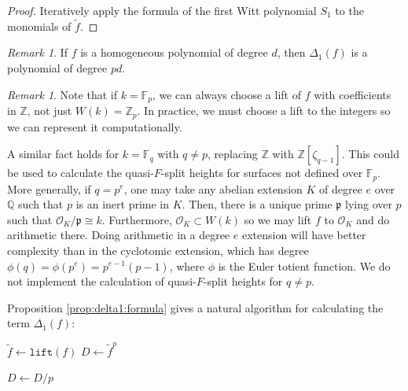 \documentclass[a4paper]{article}
\theoremstyle{definition}
\theoremstyle{remark}
\newtheorem{rmk}[thm]{Remark}
\newcommand{\isom}{\cong}
\newcommand{\ins}{\subset}
\begin{document}
\begin{proof}
	Iteratively apply the formula of the first
	Witt polynomial \(S_{1}\) 
	to the monomials of \(\tilde{f}\).
\end{proof}

\begin{rmk}
	If \(f\) is a homogeneous polynomial of degree \(d\), 
	then \(\Delta_{1}(f)\) is a polynomial of degree \(pd\).
\end{rmk}

\begin{rmk}
    \label{rmk:lift:roi}
    Note that if \(k = \mathbb{F}_{p}\), we can always choose a lift
    of \(f\) with coefficients in \(\mathbb{Z}\), 
    not just \(W(k) = \mathbb{Z}_{p}\).
    In practice, we must choose a lift to the integers
    so we can represent it computationally.

    A similar fact holds for \(k = \mathbb{F}_{q}\) with 
    \(q \neq p\), replacing \(\mathbb{Z}\) with
    \(\mathbb{Z}[\zeta_{q-1}]\).
    This could be used to calculate the quasi-\(F\)-split 
    heights for surfaces not defined over \(\mathbb{F}_{p}\).
    More generally, if \(q = p^{e}\), one may take
    any abelian extension \(K\) of degree \(e\) over \(\mathbb{Q}\) such that
    \(p\) is an inert prime in \(K\).
    Then, there is a unique prime \(\mathfrak{p}\) lying over \(p\) 
    such that \(\mathcal{O}_{K} / \mathfrak{p} \isom k\).
    Furthermore, \(\mathcal{O}_{K} \ins W(k)\)
    so we may lift \(f\) to \(\mathcal{O}_{K}\) 
    and do arithmetic there. 
    Doing arithmetic in a degree \(e\) extension will have
    better complexity than in the cyclotomic extension, which
    has degree \(\phi(q) = \phi(p^{e}) = p^{e-1}(p-1)\), where
    \(\phi\) is the Euler totient function.
    We do not implement the calculation of quasi-\(F\)-split
    heights for \(q \neq p\).
\end{rmk}



Proposition \ref{prop:delta1:formula} gives a natural algorithm
for calculating the term \(\Delta_{1}(f)\): 


\begin{algorithm}[H]
\label{alg:calc:delta1}
\caption{Calculation of \(\Delta_{1}(f)\) }

$\tilde{f} \gets \texttt{lift}(f)$\;
$D \gets \tilde{f}^p$\;


$D \gets D / p$

\end{algorithm}
\end{document}
